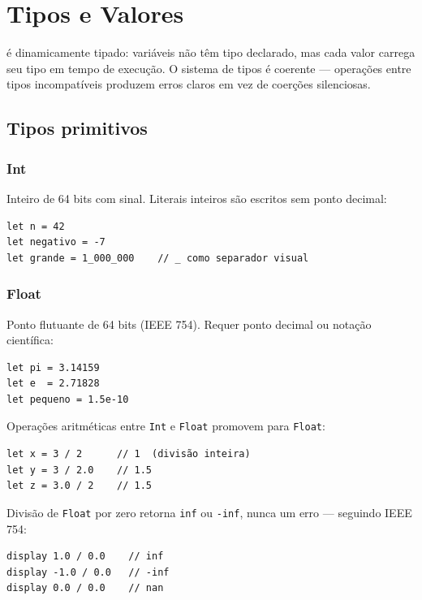 \chapter{Tipos e Valores}

\hayashi{} é dinamicamente tipado: variáveis não têm tipo declarado, mas cada valor
carrega seu tipo em tempo de execução. O sistema de tipos é coerente — operações entre
tipos incompatíveis produzem erros claros em vez de coerções silenciosas.

\section{Tipos primitivos}

\subsection{Int}

Inteiro de 64 bits com sinal. Literais inteiros são escritos sem ponto decimal:

\begin{lstlisting}
let n = 42
let negativo = -7
let grande = 1_000_000    // _ como separador visual
\end{lstlisting}

\subsection{Float}

Ponto flutuante de 64 bits (IEEE 754). Requer ponto decimal ou notação científica:

\begin{lstlisting}
let pi = 3.14159
let e  = 2.71828
let pequeno = 1.5e-10
\end{lstlisting}

Operações aritméticas entre \texttt{Int} e \texttt{Float} promovem para \texttt{Float}:

\begin{lstlisting}
let x = 3 / 2      // 1  (divisão inteira)
let y = 3 / 2.0    // 1.5
let z = 3.0 / 2    // 1.5
\end{lstlisting}

Divisão de \texttt{Float} por zero retorna \texttt{inf} ou \texttt{-inf}, nunca
um erro — seguindo IEEE 754:

\begin{lstlisting}
display 1.0 / 0.0    // inf
display -1.0 / 0.0   // -inf
display 0.0 / 0.0    // nan
\end{lstlisting}

